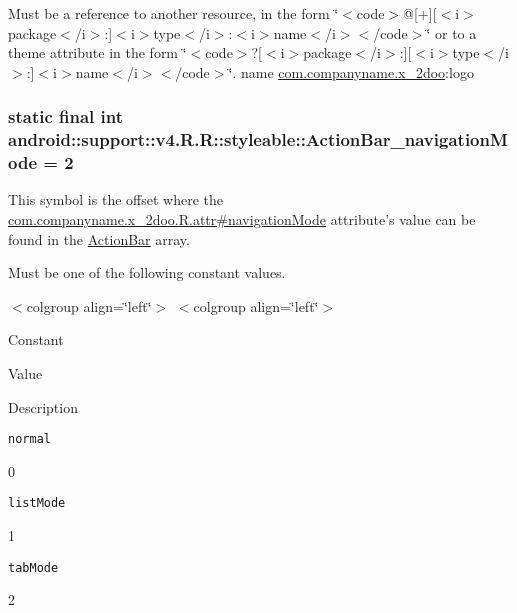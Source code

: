 Must be a reference to another resource, in the form \char`\"{}$<$code$>$@\mbox{[}+\mbox{]}\mbox{[}$<$i$>$package$<$/i$>$:\mbox{]}$<$i$>$type$<$/i$>$:$<$i$>$name$<$/i$>$$<$/code$>$\char`\"{} or to a theme attribute in the form \char`\"{}$<$code$>$?\mbox{[}$<$i$>$package$<$/i$>$:\mbox{]}\mbox{[}$<$i$>$type$<$/i$>$:\mbox{]}$<$i$>$name$<$/i$>$$<$/code$>$\char`\"{}.  name \hyperlink{namespacecom_1_1companyname_1_1x__2doo}{com.companyname.x\_\-2doo}:logo \hypertarget{classandroid_1_1support_1_1v4_1_1_r_1_1styleable_57771890bb08e78ec220a5ffac58bd77}{
\subsubsection[{ActionBar\_\-navigationMode}]{\setlength{\rightskip}{0pt plus 5cm}static final int android::support::v4.R.R::styleable::ActionBar\_\-navigationMode = 2}}
\label{classandroid_1_1support_1_1v4_1_1_r_1_1styleable_57771890bb08e78ec220a5ffac58bd77}


This symbol is the offset where the \hyperlink{classcom_1_1companyname_1_1x__2doo_1_1_r_1_1attr_5351b043733ecb04a8772765eca6beac}{com.companyname.x\_\-2doo.R.attr\#navigationMode} attribute's value can be found in the \hyperlink{classandroid_1_1support_1_1v4_1_1_r_1_1styleable_5c6cf2c83551ebae05f365bb913fdddf}{ActionBar} array.

Must be one of the following constant values. \begin{TabularC}{0}
\hline
\end{TabularC}
$<$colgroup align=\char`\"{}left\char`\"{}$>$ $<$colgroup align=\char`\"{}left\char`\"{}$>$ 

Constant

Value

Description 

{\tt normal}

0

{\tt listMode}

1

{\tt tabMode}

2

